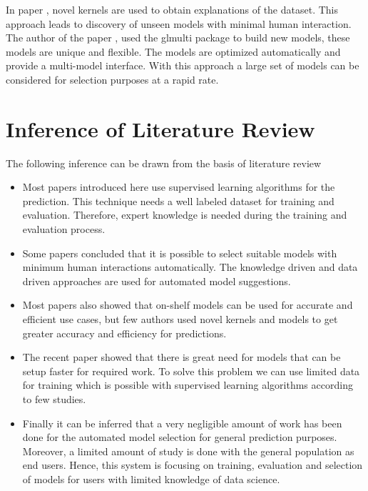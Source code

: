 In paper \cite{malkomes2016bayesian}, novel kernels are used to obtain explanations of the
dataset. This approach leads to discovery of unseen models with minimal human interaction.
The author of the paper \cite{JSSv034i12}, used the glmulti package to build new models, these
models are unique and flexible. The models are optimized automatically and provide a
multi-model interface. With this approach a large set of models can be considered for selection
purposes at a rapid rate.

\section{Inference of Literature Review} \label{sec:inference _of_literature_review}

The following inference can be drawn from the basis of literature review

\vspace{-1.5em}

\begin{itemize}
    \item Most papers introduced here use supervised learning algorithms for the prediction.
    This technique needs a well labeled dataset for training and evaluation. Therefore, expert
    knowledge is needed during the training and evaluation process.
    \item Some papers concluded that it is possible to select suitable models with minimum
    human interactions automatically. The knowledge driven and data driven approaches are used
    for automated model suggestions.
    \item Most papers also showed that on-shelf models can be used for accurate and efficient
    use cases, but few authors used novel kernels and models to get greater accuracy and
    efficiency for predictions.
    \item The recent paper showed that there is great need for models that can be setup faster
    for required work. To solve this problem we can use limited data for training which is
    possible with supervised learning algorithms according to few studies.
    \item Finally it can be inferred that a very negligible amount of work has been done for
    the automated model selection for general prediction purposes. Moreover, a limited amount
    of study is done with the general population as end users. Hence, this system is focusing
    on training, evaluation and selection of models for users with limited knowledge of data
    science.
\end{itemize}
